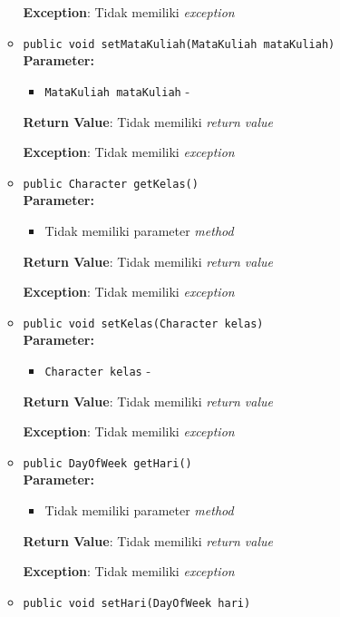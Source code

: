 \documentclass{article}
\begin{document}
\begin{enumerate}
\begin{itemize}
\textbf{Exception}: Tidak memiliki \textit{exception}

\item \texttt{public void setMataKuliah(MataKuliah mataKuliah)}\\ 


\textbf{Parameter:}\begin{itemize}
\item \texttt{MataKuliah mataKuliah} - 
\end{itemize}
\textbf{Return Value}: Tidak memiliki \textit{return value}

\textbf{Exception}: Tidak memiliki \textit{exception}

\item \texttt{public Character getKelas()}\\ 


\textbf{Parameter:}\begin{itemize}
\item Tidak memiliki parameter \textit{method}
\end{itemize}
\textbf{Return Value}: Tidak memiliki \textit{return value}

\textbf{Exception}: Tidak memiliki \textit{exception}

\item \texttt{public void setKelas(Character kelas)}\\ 


\textbf{Parameter:}\begin{itemize}
\item \texttt{Character kelas} - 
\end{itemize}
\textbf{Return Value}: Tidak memiliki \textit{return value}

\textbf{Exception}: Tidak memiliki \textit{exception}

\item \texttt{public DayOfWeek getHari()}\\ 


\textbf{Parameter:}\begin{itemize}
\item Tidak memiliki parameter \textit{method}
\end{itemize}
\textbf{Return Value}: Tidak memiliki \textit{return value}

\textbf{Exception}: Tidak memiliki \textit{exception}

\item \texttt{public void setHari(DayOfWeek hari)}\\ 



\end{itemize}
\end{enumerate}
\end{document}
